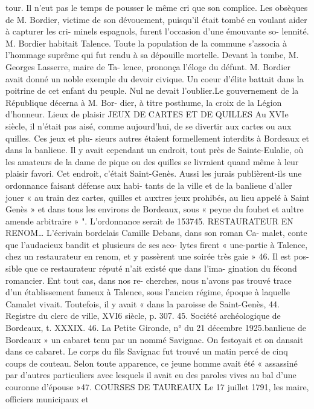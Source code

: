 \documentclass[a4paper,11pt]{book}
\begin{document}
tour. Il n'eut pas le temps de pousser le même cri que son
complice.
Les obsèques de M. Bordier, victime de son dévouement,
puisqu'il était tombé en voulant aider à capturer les cri-
minels espagnols, furent l'occasion d'une émouvante so-
lennité. M. Bordier habitait Talence. Toute la population de
la commune s'associa à l'hommage suprême qui fut rendu
à sa dépouille mortelle.
Devant la tombe, M. Georges Lasserre, maire de Ta-
lence, prononça l'éloge du défunt. M. Bordier avait donné
un noble exemple du devoir civique. Un coeur d'élite battait
dans la poitrine de cet enfant du peuple. Nul ne devait
l'oublier.Le gouvernement de la République décerna à M. Bor-
dier, à titre posthume, la croix de la Légion d'honneur.
Lieux de plaisir
JEUX DE CARTES ET DE QUILLES
Au XVIe siècle, il n'était pas aisé, comme aujourd'hui,
de se divertir aux cartes ou aux quilles. Ces jeux et plu-
sieurs autres étaient formellement interdits à Bordeaux et
dans la banlieue. Il y avait cependant un endroit, tout près
de Sainte-Eulalie, où les amateurs de la dame de pique
ou des quilles se livraient quand même à leur plaisir
favori. Cet endroit, c'était Saint-Genès. Aussi les jurais
publièrent-ils une ordonnance faisant défense aux habi-
tants de la ville et de la banlieue d'aller jouer « au train
dez cartes, quilles et auxtres jeux prohibés, au lieu appelé
à Saint Genès » et dans tous les environs de Bordeaux,
sous « peyne du fouhet et aultre amende arbitraire » ".
L'ordonnance serait de 153745.
RESTAURATEUR EN RENOM…
L'écrivain bordelais Camille Debans, dans son roman Ca-
malet, conte que l'audacieux bandit et plusieurs de ses aco-
lytes firent « une-partie à Talence, chez un restaurateur en
renom, et y passèrent une soirée très gaie » 46. Il est pos-
sible que ce restaurateur réputé n'ait existé que dans l'ima-
gination du fécond romancier. Ent tout cas, dans nos re-
cherches, nous n'avons pas trouvé trace d'un établissement
fameux à Talence, sous l'ancien régime, époque à laquelle
Camalet vivait.
Toutefois, il y avait « dans la paroisse de Saint-Genès,
44. Registre du clerc de ville, XVI6 siècle, p. 307.
45. Société archéologique de Bordeaux, t. XXXIX.
46. La Petite Gironde, n° du 21 décembre 1925.banlieue de Bordeaux » un cabaret tenu par un nommé
Savignac. On festoyait et on dansait dans ce cabaret. Le
corps du fils Savignac fut trouvé un matin percé de cinq
coups de couteau. Selon toute apparence, ce jeune homme
avait été « assassiné par d'autres particuliers avec lesquels
il avait eu des paroles vives au bal d'une couronne
d'épouse »47.
COURSES DE TAUREAUX
Le 17 juillet 1791, les maire, officiers municipaux et
\end{document}
